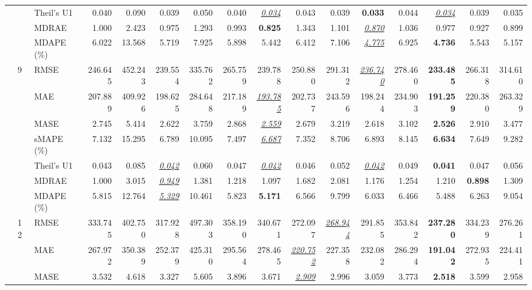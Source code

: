 \begin{table}[!htbp]
{\begin{tabular}{lllrrrrrrrrrrrrr}
 &  & Theil's U1 & 0.040 & 0.090 & 0.039 & 0.050 & 0.040 & \underline{\textit{0.034}} & 0.043 & 0.039 & \textbf{0.033} & 0.044 & \underline{\textit{0.034}} & 0.039 & 0.035 \\
 &  & MDRAE & 1.000 & 2.423 & 0.975 & 1.293 & 0.993 & \textbf{0.825} & 1.343 & 1.101 & \underline{\textit{0.870}} & 1.036 & 0.977 & 0.927 & 0.899 \\
 &  & MDAPE (\%) & 6.022 & 13.568 & 5.719 & 7.925 & 5.898 & 5.442 & 6.412 & 7.106 & \underline{\textit{4.775}} & 6.925 & \textbf{4.736} & 5.543 & 5.157 \\
\cmidrule(lr){2-16}
 & 9 & RMSE & 246.645 & 452.243 & 239.554 & 335.762 & 265.759 & 239.788 & 250.880 & 291.312 & \underline{\textit{236.740}} & 278.460 & \textbf{233.485} & 266.318 & 314.610 \\
 &  & MAE & 207.889 & 409.926 & 198.625 & 284.648 & 217.189 & \underline{\textit{193.785}} & 202.737 & 243.596 & 198.244 & 234.903 & \textbf{191.259} & 220.380 & 263.329 \\
 &  & MASE & 2.745 & 5.414 & 2.622 & 3.759 & 2.868 & \underline{\textit{2.559}} & 2.679 & 3.219 & 2.618 & 3.102 & \textbf{2.526} & 2.910 & 3.477 \\
 &  & sMAPE (\%) & 7.132 & 15.295 & 6.789 & 10.095 & 7.497 & \underline{\textit{6.687}} & 7.352 & 8.706 & 6.893 & 8.145 & \textbf{6.634} & 7.649 & 9.282 \\
 &  & Theil's U1 & 0.043 & 0.085 & \underline{\textit{0.042}} & 0.060 & 0.047 & \underline{\textit{0.042}} & 0.046 & 0.052 & \underline{\textit{0.042}} & 0.049 & \textbf{0.041} & 0.047 & 0.056 \\
 &  & MDRAE & 1.000 & 3.015 & \underline{\textit{0.949}} & 1.381 & 1.218 & 1.097 & 1.682 & 2.081 & 1.176 & 1.254 & 1.210 & \textbf{0.898} & 1.309 \\
 &  & MDAPE (\%) & 5.815 & 12.764 & \underline{\textit{5.329}} & 10.461 & 5.823 & \textbf{5.171} & 6.566 & 9.799 & 6.033 & 6.466 & 5.488 & 6.263 & 9.054 \\
\cmidrule(lr){2-16}
 & 12 & RMSE & 333.745 & 402.750 & 317.928 & 497.303 & 358.190 & 340.671 & 272.097 & \underline{\textit{268.944}} & 291.855 & 353.842 & \textbf{237.280} & 334.239 & 276.261 \\
 &  & MAE & 267.972 & 350.389 & 252.379 & 425.310 & 295.564 & 278.465 & \underline{\textit{220.752}} & 227.358 & 232.082 & 286.294 & \textbf{191.042} & 272.935 & 224.411 \\
 &  & MASE & 3.532 & 4.618 & 3.327 & 5.605 & 3.896 & 3.671 & \underline{\textit{2.909}} & 2.996 & 3.059 & 3.773 & \textbf{2.518} & 3.599 & 2.958 \\

\end{tabular}}
\end{table}
